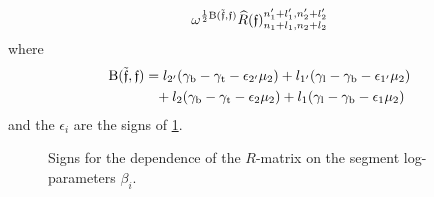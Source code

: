 \documentclass{sl2ams}
\numberwithin{equation}{section}
\begin{document}
\begin{lemma}
\begin{thmenum}
\begin{equation}
          \omega^{
            \frac{1}{2} \mathrm{B}(\tilde{\mathfrak{f}}, \mathfrak{f})
          }
          \rmat[\mathfrak{f}]{n_{1} + l_{1},}{n_{2} + l_{2}}{n_{1}' + l_{1}', }{n_{2}' + l_{2}'}
      \end{equation}
      where
      \[
        \begin{aligned}
          \mathrm{B}(\tilde{\mathfrak{f}}, \mathfrak{f})
          &=
          l_{2'}(\gamma_{\mathrm{b}} - \gamma_{\mathrm{t}} - \epsilon_{2'} \mu_{2})
          +
          l_{1'}(\gamma_{\mathrm{l}} - \gamma_{\mathrm{b}} - \epsilon_{1'} \mu_{2})
          \\
          &\phantom{=}
          +
          l_{2}(\gamma_{\mathrm{b}} - \gamma_{\mathrm{t}} - \epsilon_{2} \mu_{2})
          +
          l_{1}(\gamma_{\mathrm{l}} - \gamma_{\mathrm{b}} - \epsilon_{1} \mu_{2})
        \end{aligned}
      \]
      and the \(\epsilon_i\) are the signs of \cref{fig:crossing-log-dec-signs}.
  \end{thmenum}
\end{lemma}

\begin{figure}
  \centering
  
  \caption{Signs for the dependence of the \(R\)-matrix on the segment log-parameters \(\beta_{i}\).}
  \label{fig:crossing-log-dec-signs}
\end{figure}
\end{document}

